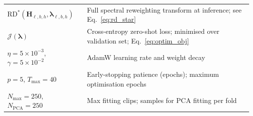 \begin{table}[h]
\begin{tabularx}{\textwidth}{lX}
$\mathrm{RD}^*(\mathbf{H}_{\ell,b,h},\boldsymbol{\lambda}_{\ell,b,h})$ & Full spectral reweighting transform at inference; see Eq.~\eqref{eq:rd_star} \\
$\mathcal{J}(\boldsymbol{\lambda})$ & Cross-entropy zero-shot loss; minimised over validation set; Eq.~\eqref{eq:optim_obj} \\
$\eta = 5\times10^{-3}$, $\gamma = 5\times10^{-2}$ & AdamW learning rate and weight decay \\
$p = 5$, $T_{\max} = 40$ & Early-stopping patience (epochs); maximum optimisation epochs \\
$N_{\max} = 250$, $N_{\mathrm{PCA}} = 250$ & Max fitting clips; samples for PCA fitting per fold \\
\bottomrule
\end{tabularx}
\end{table}
